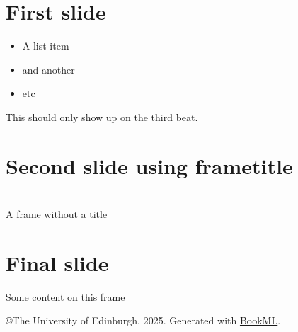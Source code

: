 \documentclass{article}
\renewenvironment{frame}[1]{\section{#1}}{}
\newcommand{\visible}{}
\begin{document}
\iflatexml\else
    \frame{\titlepage}
\fi


\begin{frame}{First slide}
    \begin{itemize}
        \item A list item
        \item and another
        \item etc
    \end{itemize}

    \visible{This should only show up on the third beat.}
\end{frame}

\begin{frame}{Second slide using frametitle}
\end{frame}

\begin{frame}{}
    A frame without a title
\end{frame}

\begin{frame}{Final slide}
    Some content on this frame
\end{frame}






\iflatexml
    \copyright The University of Edinburgh, 2025. Generated with \href{https://vlmantova.github.io/bookml/}{BookML}.
\fi
\end{document}
